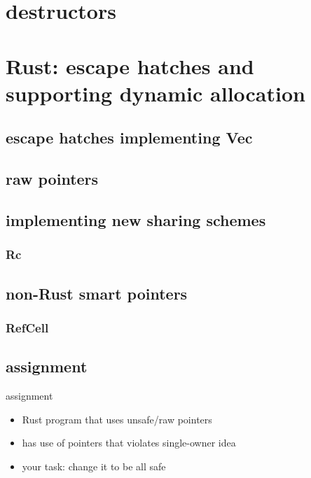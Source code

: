 \section{destructors}


\section{Rust: escape hatches and supporting dynamic allocation}


\subsection{escape hatches implementing Vec}


\subsection{raw pointers}



\subsection{implementing new sharing schemes}
\subsubsection{Rc}


\subsection{non-Rust smart pointers}


\subsubsection{RefCell}


\subsection{assignment}
\begin{frame}{assignment}
    \begin{itemize}
    \item Rust program that uses unsafe/raw pointers
    \item has use of pointers that violates single-owner idea
    \vspace{.5cm}
    \item your task: change it to be all safe
    \end{itemize}
\end{frame}

